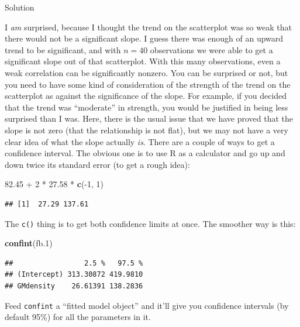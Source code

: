 \documentclass[]{tufte-book}
\newenvironment{Shaded}{}{}
\newcommand{\DecValTok}[1]{\textcolor[rgb]{0.25,0.63,0.44}{#1}}
\newcommand{\FloatTok}[1]{\textcolor[rgb]{0.25,0.63,0.44}{#1}}
\newcommand{\KeywordTok}[1]{\textcolor[rgb]{0.00,0.44,0.13}{\textbf{#1}}}
\newcommand{\NormalTok}[1]{#1}
\newcommand{\OperatorTok}[1]{\textcolor[rgb]{0.40,0.40,0.40}{#1}}
\newcommand{\StringTok}[1]{\textcolor[rgb]{0.25,0.44,0.63}{#1}}
\theoremstyle{definition}
\theoremstyle{definition}
\theoremstyle{definition}
\theoremstyle{remark}
\begin{document}
Solution

I \emph{am} surprised, because I thought the trend on the scatterplot
was so weak that there would not be a significant slope. I guess there
was enough of an upward trend to be significant, and with \(n=40\)
observations we were able to get a significant slope out of that
scatterplot. With this many observations, even a weak correlation can be
significantly nonzero. You can be surprised or not, but you need to have
some kind of consideration of the strength of the trend on the
scatterplot as against the significance of the slope. For example, if
you decided that the trend was ``moderate'' in strength, you would be
justified in being less surprised than I was. Here, there is the usual
issue that we have proved that the slope is not zero (that the
relationship is not flat), but we may not have a very clear idea of what
the slope actually \emph{is}. There are a couple of ways to get a
confidence interval. The obvious one is to use R as a calculator and go
up and down twice its standard error (to get a rough idea):

\begin{Shaded}
\begin{Highlighting}[]
\FloatTok{82.45} \OperatorTok{+}\StringTok{ }\DecValTok{2} \OperatorTok{*}\StringTok{ }\FloatTok{27.58} \OperatorTok{*}\StringTok{ }\KeywordTok{c}\NormalTok{(}\OperatorTok{-}\DecValTok{1}\NormalTok{, }\DecValTok{1}\NormalTok{)}
\end{Highlighting}
\end{Shaded}

\begin{verbatim}
## [1]  27.29 137.61
\end{verbatim}

The \texttt{c()} thing is to get both confidence limits at once. The
smoother way is this:

\begin{Shaded}
\begin{Highlighting}[]
\KeywordTok{confint}\NormalTok{(fb}\FloatTok{.1}\NormalTok{)}
\end{Highlighting}
\end{Shaded}

\begin{verbatim}
##                 2.5 %   97.5 %
## (Intercept) 313.30872 419.9810
## GMdensity    26.61391 138.2836
\end{verbatim}

Feed \texttt{confint} a ``fitted model object'' and it'll give you
confidence intervals (by default 95\%) for all the parameters in it.
\end{document}
